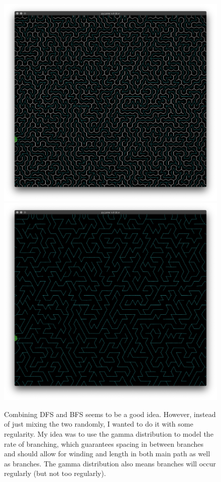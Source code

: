 \documentclass[a4paper,12pt]{article}
\begin{document}
\begin{figure}[ht]
  \centering
  \includegraphics[width=0.7\linewidth]{images/maze-gamma.png}
  \includegraphics[width=0.7\linewidth]{images/maze-gamma-connections.png}
  \caption{Combining DFS and BFS seems to be a good idea. However, instead of just
    mixing the two randomly, I wanted to do it with some regularity. My idea
    was to use the gamma distribution to model the rate of branching, which
    guarantees spacing in between branches and should allow for winding and length
    in both main path as well as branches. The gamma distribution also means
    branches will occur regularly (but not too regularly).
  \label{fig:maze-gamma-mix}}
\end{figure}
\end{document}
